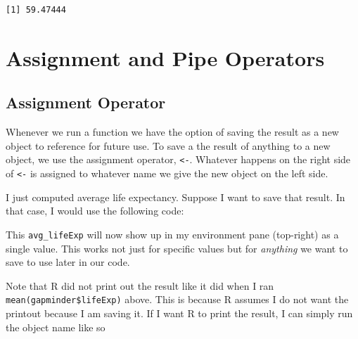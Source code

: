 \documentclass[
]{book}
\makeatletter
\newenvironment{Shaded}{\begin{snugshade}}{\end{snugshade}}
\newcommand{\FunctionTok}[1]{\textcolor[rgb]{0.27,0.27,0.27}{\textbf{#1}}}
\newcommand{\NormalTok}[1]{#1}
\newcommand{\OtherTok}[1]{\textcolor[rgb]{0.37,0.37,0.37}{#1}}
\newcommand{\SpecialCharTok}[1]{\textcolor[rgb]{0.43,0.43,0.43}{\textbf{#1}}}
\newenvironment{kframe}{%
\medskip{}
\setlength{\fboxsep}{.8em}
 \def\at@end@of@kframe{}%
 \ifinner\ifhmode%
  \def\at@end@of@kframe{\end{minipage}}%
  \begin{minipage}{\columnwidth}%
 \fi\fi%
 \def\FrameCommand##1{\hskip\@totalleftmargin \hskip-\fboxsep
 \colorbox{shadecolor}{##1}\hskip-\fboxsep
     \hskip-\linewidth \hskip-\@totalleftmargin \hskip\columnwidth}%
 \MakeFramed {\advance\hsize-\width
   \@totalleftmargin\z@ \linewidth\hsize
   \@setminipage}}%
 {\par\unskip\endMakeFramed%
 \at@end@of@kframe}
\renewenvironment{Shaded}{\begin{kframe}}{\end{kframe}}
\makeatother
\begin{document}
\begin{Shaded}
\end{Shaded}

\begin{verbatim}
[1] 59.47444
\end{verbatim}

\hypertarget{assignment-and-pipe-operators}{%
\section{Assignment and Pipe Operators}\label{assignment-and-pipe-operators}}

\hypertarget{assignment-operator}{%
\subsection{Assignment Operator}\label{assignment-operator}}

Whenever we run a function we have the option of saving the result as a new object to reference for future use. To save a the result of anything to a new object, we use the assignment operator, \texttt{\textless{}-}. Whatever happens on the right side of \texttt{\textless{}-} is assigned to whatever name we give the new object on the left side.

I just computed average life expectancy. Suppose I want to save that result. In that case, I would use the following code:

\begin{Shaded}
\end{Shaded}

This \texttt{avg\_lifeExp} will now show up in my environment pane (top-right) as a single value. This works not just for specific values but for \emph{anything} we want to save to use later in our code.

Note that R did not print out the result like it did when I ran \texttt{mean(gapminder\$lifeExp)} above. This is because R assumes I do not want the printout because I am saving it. If I want R to print the result, I can simply run the object name like so
\end{document}
